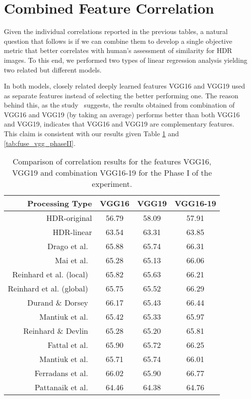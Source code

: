 \section{Combined Feature Correlation}

Given the individual correlations reported in the previous tables, a natural question that follows is if we can combine them to develop a single objective metric that better correlates with human’s assessment of similarity for HDR images. To this end, we performed two types of linear regression analysis yielding two related but different models.

In both models, closely related deeply learned features VGG16 and VGG19 used as separate features instead of selecting the better performing one. The reason behind this, as the study~\cite{simonyan2014very} suggests, the results obtained from combination of VGG16 and VGG19 (by taking an average) performs better than both VGG16 and VGG19, indicates that VGG16 and VGG19 are complementary features. This claim is consistent with our results given Table \ref{tab:fuse_vgg_phaseI} and \ref{tab:fuse_vgg_phaseII}.

\begin{table}
\caption{Comparison of correlation results for the features VGG16, VGG19 and combination VGG16-19 for the Phase I of the experiment.}
\label{tab:fuse_vgg_phaseI}
\begin{tabular}{r|c|c|c}
\textbf{Processing Type} & \textbf{VGG16} & \textbf{VGG19} & \textbf{VGG16-19} \\
\hline
HDR-original &  56.79 & 58.09 & 57.91 \\
HDR-linear &  63.54 & 63.31 & 63.85 \\
Drago et al.~\cite{drago2003adaptive} &  65.88 & 65.74 & 66.31 \\
Mai et al.~\cite{mai2011subjective} &  65.28 & 65.13 & 66.06 \\
Reinhard et al. (local)~\cite{reinhard2002photographic} & 65.82 & 65.63 & 66.21 \\
Reinhard et al. (global)~\cite{reinhard2002photographic} & 65.75 & 65.52 & 66.29 \\
Durand \& Dorsey~\cite{durand2002fast} & 66.17 & 65.43 & 66.44 \\
Mantiuk et al.~\cite{mantiuk2006backward} & 65.42 & 65.33 & 65.97 \\
Reinhard \& Devlin~\cite{reinhard2005dynamic} & 65.28 & 65.20 & 65.81 \\
Fattal et al.~\cite{durand2002fast} & 65.90 & 65.72 & 66.25 \\
Mantiuk et al.~\cite{mantiuk2008modeling} & 65.71 & 65.74 & 66.01 \\
Ferradans et al.~\cite{ferradans2011analysis} & 66.02 & 65.90 & 66.77 \\
Pattanaik et al.~\cite{pattanaik2000time} & 64.46 & 64.38 & 64.76
\end{tabular}
\end{table}

